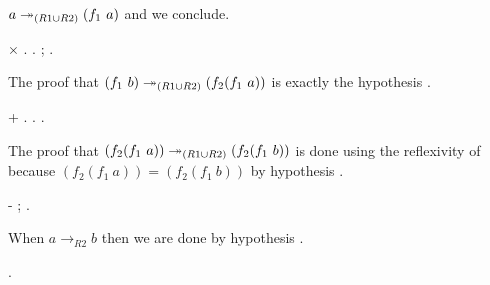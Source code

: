         $a\twoheadrightarrow_{(R1\cup R2)} (f_1\ a)$ and we conclude. \begin{coqdoccode}
\coqdocemptyline
\coqdocindent{3.00em}
\ensuremath{\times}    .  .    ; . \end{coqdoccode}
        The proof that $(f_1\ b)\twoheadrightarrow_{(R1\cup R2)} (f_2 (f_1\ a))$ is
        exactly the hypothesis . \begin{coqdoccode}
\coqdocemptyline
\coqdocindent{2.00em}
+    .  .  . \end{coqdoccode}
The proof that $(f_2
    (f_1\ a)) \twoheadrightarrow_{(R1\cup R2)} (f_2 (f_1\ b))$ is done using the
    reflexivity of  because $(f_2 (f_1\ a)) = (f_2 (f_1\
    b))$ by hypothesis . \begin{coqdoccode}
\coqdocemptyline
\coqdocindent{1.00em}
-  ; . \end{coqdoccode}
When $a \to_{R2} b$ then we are done by
    hypothesis . \begin{coqdoccode}
\coqdocemptyline
\coqdocnoindent
{}.\coqdoceol
\coqdocemptyline
\end{coqdoccode}
